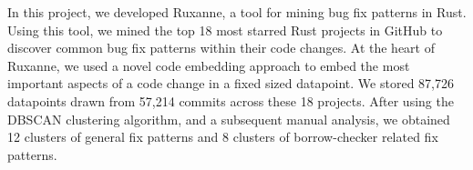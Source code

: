 In this project, we developed Ruxanne, a tool for mining bug fix patterns in Rust. Using this tool, we mined the top 18 most starred Rust projects in GitHub to discover common bug fix patterns within their code changes. At the heart of Ruxanne, we used a novel code embedding approach to embed the most important aspects of a code change in a fixed sized datapoint. We stored 87,726 datapoints drawn from 57,214 commits across these 18 projects. After using the DBSCAN clustering algorithm, and a subsequent manual analysis, we obtained 12 clusters of general fix patterns and 8 clusters of borrow-checker related fix patterns.
